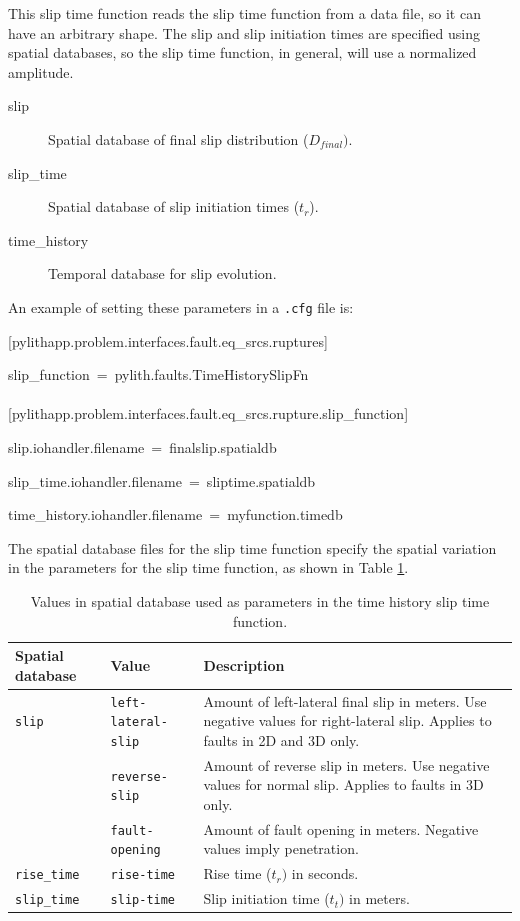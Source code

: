 This slip time function reads the slip time function from a data file,
so it can have an arbitrary shape. The slip and slip initiation times
are specified using spatial databases, so the slip time function,
in general, will use a normalized amplitude.
\begin{description}
\item [{slip}] Spatial database of final slip distribution ($D_{final})$.
\item [{slip\_time}] Spatial database of slip initiation times ($t_{r}$).
\item [{time\_history}] Temporal database for slip evolution.
\end{description}
An example of setting these parameters in a \texttt{.cfg} file is:
\begin{lyxcode}
{[}pylithapp.problem.interfaces.fault.eq\_srcs.ruptures{]}

slip\_function~=~pylith.faults.TimeHistorySlipFn~\\
~\\
{[}pylithapp.problem.interfaces.fault.eq\_srcs.rupture.slip\_function{]}

slip.iohandler.filename~=~finalslip.spatialdb

slip\_time.iohandler.filename~=~sliptime.spatialdb

time\_history.iohandler.filename~=~myfunction.timedb
\end{lyxcode}
The spatial database files for the slip time function specify the
spatial variation in the parameters for the slip time function, as
shown in Table \ref{tab:Brune-slip-db-params-2}.

\noindent \begin{center}
\begin{table}[H]
\noindent \centering{}\caption{\label{tab:Brune-slip-db-params-2}Values in spatial database used
as parameters in the time history slip time function.}
\medskip{}
\begin{tabular}{|l|l|>{\raggedright}p{2.5in}|}
\hline 
\textbf{Spatial database} & \textbf{Value} & \textbf{Description}\tabularnewline
\hline 
\hline 
\texttt{slip} & \texttt{left-lateral-slip} & Amount of left-lateral final slip in meters. Use negative values for
right-lateral slip. Applies to faults in 2D and 3D only.\tabularnewline
 & \texttt{reverse-slip} & Amount of reverse slip in meters. Use negative values for normal slip.
Applies to faults in 3D only.\tabularnewline
 & \texttt{fault-opening} & Amount of fault opening in meters. Negative values imply penetration.\tabularnewline
\hline 
\texttt{rise\_time} & \texttt{rise-time} & Rise time ($t_{r})$ in seconds.\tabularnewline
\hline 
\texttt{slip\_time} & \texttt{slip-time} & Slip initiation time ($t_{t})$ in meters.\tabularnewline
\hline 
\end{tabular}
\end{table}

\par\end{center}


